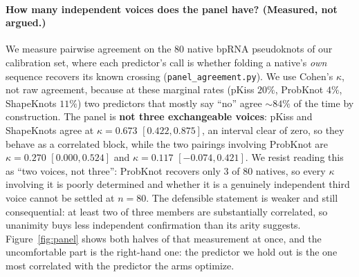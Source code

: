 \documentclass[11pt]{article}
\begin{document}
\paragraph{How many independent voices does the panel have? (Measured, not argued.)} We measure pairwise
agreement on the $80$ native bpRNA pseudoknots of our calibration set, where each predictor's call is whether
folding a native's \emph{own} sequence recovers its known crossing (\texttt{panel\_agreement.py}). We use Cohen's $\kappa$, not raw agreement, because at these marginal rates (pKiss $20\%$, ProbKnot $4\%$,
ShapeKnots $11\%$) two predictors that mostly say ``no'' agree $\sim\!84\%$ of the time by construction. The
panel is \textbf{not three exchangeable voices}: pKiss and ShapeKnots agree at $\kappa=0.673$ $[0.422,0.875]$,
an interval clear of zero, so they behave as a correlated block, while the two pairings involving ProbKnot are
$\kappa=0.270$ $[0.000,0.524]$ and $\kappa=0.117$ $[-0.074,0.421]$. We resist reading this as ``two voices, not
three'': ProbKnot recovers only $3$ of $80$ natives, so every $\kappa$ involving it is poorly determined and
whether it is a genuinely independent third voice cannot be settled at $n{=}80$. The defensible statement is weaker and still consequential: at least two of three members are substantially correlated, so unanimity buys less independent confirmation than its arity suggests. Figure~\ref{fig:panel}
shows both halves of that measurement at once, and the uncomfortable part is the right-hand one: the
predictor we hold out is the one most correlated with the predictor the arms optimize.
\end{document}
